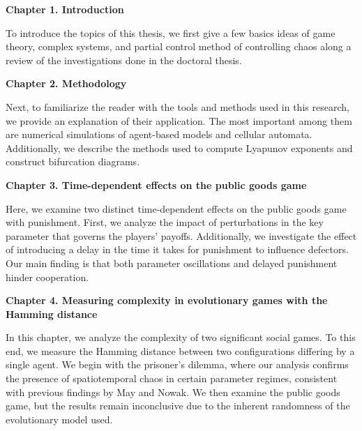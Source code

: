 
\clearpage

{\bf  Chapter 1. Introduction}

\vspace{0.6cm}

To introduce the topics of this thesis, we first give a few basics ideas of game theory, complex systems, and partial control method of controlling chaos along a review of the investigations done in the doctoral thesis.

\vspace{0.6cm}

{\bf  Chapter 2. Methodology}

\vspace{0.6cm}

Next, to familiarize the reader with the tools and methods used in this research, we provide an explanation of their application. The most important among them are numerical simulations of agent-based models and cellular automata. Additionally, we describe the methods used to compute Lyapunov exponents and construct bifurcation diagrams.


\vspace{0.6cm}

{\bf  Chapter 3. Time-dependent effects on the public goods game}  

\vspace{0.6cm}

Here, we examine two distinct time-dependent effects on the public goods game with punishment. First, we analyze the impact of perturbations in the key parameter that governs the players' payoffs. Additionally, we investigate the effect of introducing a delay in the time it takes for punishment to influence defectors. Our main finding is that both parameter oscillations and delayed punishment hinder cooperation.


\vspace{0.6cm}

{\bf  Chapter 4. Measuring complexity in evolutionary games with the Hamming distance} 
 
\vspace{0.6cm}


In this chapter, we analyze the complexity of two significant social games. To this end, we measure the Hamming distance between two configurations differing by a single agent. We begin with the prisoner's dilemma, where our analysis confirms the presence of spatiotemporal chaos in certain parameter regimes, consistent with previous findings by May and Nowak. We then examine the public goods game, but the results remain inconclusive due to the inherent randomness of the evolutionary model used.


